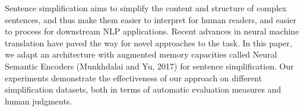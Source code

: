 Sentence simplification aims to simplify the content and structure of complex sentences, and thus make them easier to interpret for human readers, and easier to process for downstream NLP applications. Recent advances in neural machine translation have paved the way for novel approaches to the task. In this paper, we adapt an architecture with augmented memory capacities called Neural Semantic Encoders (Munkhdalai and Yu, 2017) for sentence simplification. Our experiments demonstrate the effectiveness of our approach on different simplification datasets, both in terms of automatic evaluation measures and human judgments.
